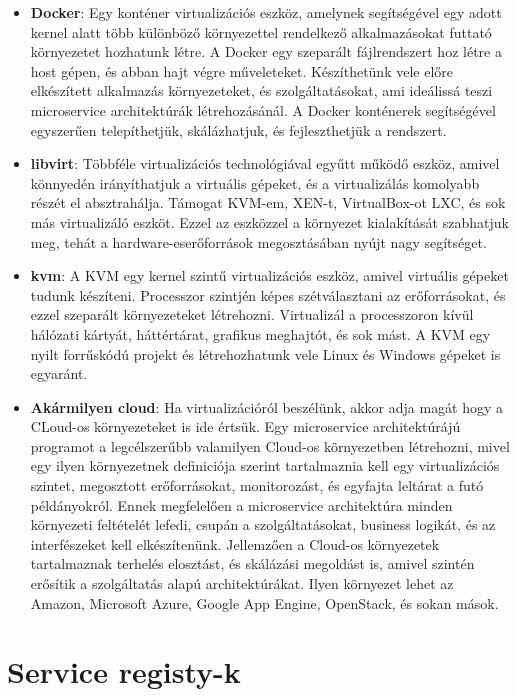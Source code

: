 \documentclass[11pt,magyar,a4paper,oneside,]{report}
\begin{document}
\begin{itemize}
\item
  \textbf{Docker}: Egy konténer virtualizációs eszköz, amelynek
  segítségével egy adott kernel alatt több különböző környezettel
  rendelkező alkalmazásokat futtató környezetet hozhatunk létre. A
  Docker egy szeparált fájlrendszert hoz létre a host gépen, és abban
  hajt végre műveleteket. Készíthetünk vele előre elkészített alkalmazás
  környezeteket, és szolgáltatásokat, ami ideálissá teszi microservice
  architektúrák létrehozásánál. A Docker konténerek segítségével
  egyszerűen telepíthetjük, skálázhatjuk, és fejleszthetjük a rendszert.
\item
  \textbf{libvirt}: Többféle virtualizációs technológiával egyűtt működő
  eszköz, amivel könnyedén irányíthatjuk a virtuális gépeket, és a
  virtualizálás komolyabb részét el absztrahálja. Támogat KVM-em, XEN-t,
  VirtualBox-ot LXC, és sok más virtualizáló eszköt. Ezzel az eszközzel
  a környezet kialakítását szabhatjuk meg, tehát a
  hardware-eserőforrások megosztásában nyújt nagy segítséget.
\item
  \textbf{kvm}: A KVM egy kernel szintű virtualizációs eszköz, amivel
  virtuális gépeket tudunk készíteni. Processzor szintjén képes
  szétválasztani az erőforrásokat, és ezzel szeparált környezeteket
  létrehozni. Virtualizál a processzoron kívül hálózati kártyát,
  háttértárat, grafikus meghajtót, és sok mást. A KVM egy nyilt
  forrűskódú projekt és létrehozhatunk vele Linux és Windows gépeket is
  egyaránt.
\item
  \textbf{Akármilyen cloud}: Ha virtualizációról beszélünk, akkor adja
  magát hogy a CLoud-os környezeteket is ide értsük. Egy microservice
  architektúrájú programot a legcélszerűbb valamilyen Cloud-os
  környezetben létrehozni, mivel egy ilyen környezetnek definiciója
  szerint tartalmaznia kell egy virtualizációs szintet, megosztott
  erőforrásokat, monitorozást, és egyfajta leltárat a futó példányokról.
  Ennek megfelelően a microservice architektúra minden környezeti
  feltételét lefedi, csupán a szolgáltatásokat, business logikát, és az
  interfészeket kell elkészítenünk. Jellemzően a Cloud-os környezetek
  tartalmaznak terhelés elosztást, és skálázási megoldást is, amivel
  szintén erősítik a szolgáltatás alapú architektúrákat. Ilyen környezet
  lehet az Amazon, Microsoft Azure, Google App Engine, OpenStack, és
  sokan mások.
\end{itemize}

\section{Service registy-k}\label{service-registy-k}
\end{document}
